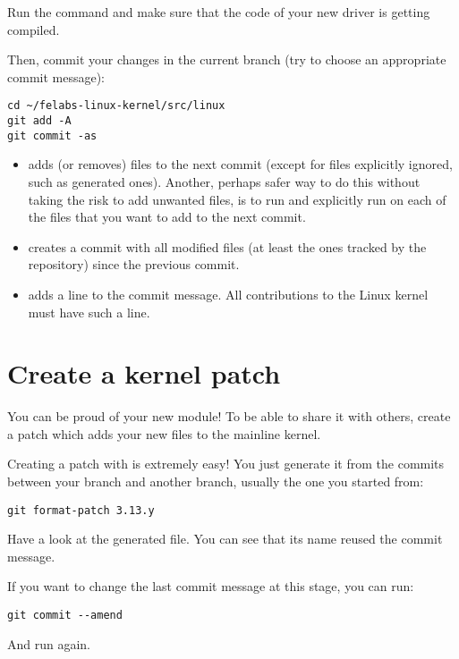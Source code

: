 Run the  command and make sure that the code of your new
driver is getting compiled.

Then, commit your changes in the current branch (try to choose an
appropriate commit message):

\begin{verbatim}
cd ~/felabs-linux-kernel/src/linux
git add -A
git commit -as
\end{verbatim}

\begin{itemize}
\item {} adds (or removes) files to the next commit
      (except for files explicitly ignored, such as generated ones).
      Another, perhaps safer way to do this without taking the risk
      to add unwanted files, is to run  and explicitly
      run  on each of the files that you want to
      add to the next commit.
\item {} creates a commit with all modified files
      (at least the ones tracked by the repository) since the previous
      commit.
\item {} adds a  line to the
      commit message. All contributions to the Linux kernel must have
      such a line.
\end{itemize}

\section{Create a kernel patch}

You can be proud of your new module! To be able to share it with
others, create a patch which adds your new files to the mainline
kernel.

Creating a patch with  is extremely easy! You just generate it
from the commits between your branch and another branch, usually the
one you started from:

\begin{verbatim}
git format-patch 3.13.y
\end{verbatim}

Have a look at the generated file. You can see that its name reused
the commit message.

If you want to change the last commit message at this stage, you
can run:

\begin{verbatim}
git commit --amend
\end{verbatim}

And run  again.
